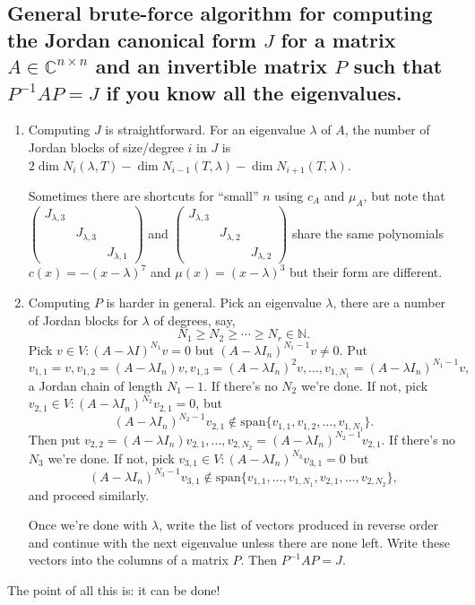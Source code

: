 \documentclass[a4paper]{article}
\newcommand{\spanset}{\text{span}}
\theoremstyle{definition}
\begin{document}
\subsection{General brute-force algorithm for computing the Jordan canonical form $J$ for a matrix $A\in \mathbb C^{n\times n}$ and an invertible matrix $P$ such that $P^{-1}AP=J$ if you know all the eigenvalues.}
\begin{enumerate}
    \item Computing $J$ is straightforward. For an eigenvalue $\lambda$ of $A$, the number of Jordan blocks of size/degree $i$ in $J$ is $2\dim N_i(\lambda,T)-\dim N_{i-1}(T,\lambda)-\dim N_{i+1}(T,\lambda)$.
    
    Sometimes there are shortcuts for ``small'' $n$ using $c_{A}$ and $\mu_{A}$, but note that $\begin{pmatrix}J_{\lambda,3}&&\\ & J_{\lambda,3} & \\ & & J_{\lambda,1} \end{pmatrix}$ and $\begin{pmatrix}J_{\lambda,3}&&\\ & J_{\lambda,2} & \\ & & J_{\lambda,2} \end{pmatrix}$ share the same polynomials $c(x)=-(x-\lambda)^7$ and $\mu(x)=(x-\lambda)^3$ but their form are different.
    
    \item Computing $P$ is harder in general. Pick an eigenvalue $\lambda$, there are a number of Jordan blocks for $\lambda$ of degrees, say,
\[
N_1\geq N_2\geq \cdots \geq N_r \in \mathbb N .
\]
Pick $v\in V : (A-\lambda I)^{N_1} v=0$ but $(A-\lambda I_n)^{N_1-1}v\neq 0$. Put
\[
v_{1,1}=v, v_{1,2}=(A-\lambda I_n)v, v_{1,3}=(A-\lambda I_n)^2v, \ldots, v_{1,N_1}=(A-\lambda I_n)^{N_1-1}v,
\]
a Jordan chain of length $N_1-1$. If there's no $N_2$ we're done. If not, pick $v_{2,1}\in V:(A-\lambda I_n)^{N_2} v_{2,1}=0$, but
\[
(A-\lambda I_n)^{N_2-1} v_{2,1} \not\in \spanset \{v_{1,1},v_{1,2},\ldots,v_{1,N_1}\}.
\]
Then put $v_{2,2}=(A-\lambda I_n) v_{2,1}, \ldots ,v_{2,N_2}=(A-\lambda I_n)^{N_2-1} v_{2,1}$. If there's no $N_3$ we're done. If not, pick $v_{3,1}\in V:(A-\lambda I_n)^{N_3} v_{3,1}=0$ but
\[
(A-\lambda I_n)^{N_3-1} v_{3,1}\not\in \spanset \{v_{1,1},\ldots,v_{1,N_1},v_{2,1},\ldots,v_{2,N_2}\},
\]
and proceed similarly.
    
    Once we're done with $\lambda$, write the list of vectors produced in reverse order and continue with the next eigenvalue unless there are none left. Write these vectors into the columns of a matrix $P$. Then $P^{-1}AP=J$.
\end{enumerate}
The point of all this is: it can be done!
\end{document}
